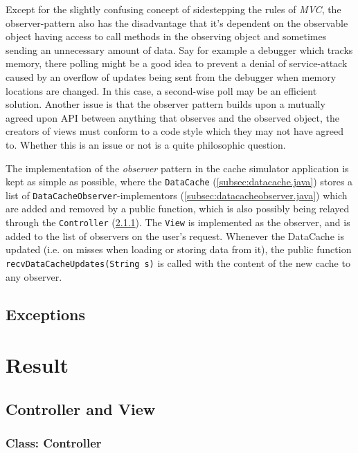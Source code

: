 \documentclass[a4paper]{scrreprt}
\begin{document}
Except for the slightly confusing concept of sidestepping the rules of \textit{MVC}, the observer-pattern also has the disadvantage that it's dependent on the observable object having access to call methods in the observing object and sometimes sending an unnecessary amount of data. Say for example a debugger which tracks memory, there polling might be a good idea to prevent a denial of service-attack caused by an overflow of updates being sent from the debugger when memory locations are changed. In this case, a second-wise poll may be an efficient solution. Another issue is that the observer pattern builds upon a mutually agreed upon API between anything that observes and the observed object, the creators of views must conform to a code style which they may not have agreed to. Whether this is an issue or not is a quite philosophic question.

The implementation of the \textit{observer} pattern in the cache simulator application is kept as simple as possible, where the \texttt{DataCache} (\ref{subsec:datacache.java}) stores a list of \texttt{DataCacheObserver}-implementors (\ref{subsec:datacacheobserver.java}) which are added and removed by a public function, which is also possibly being relayed through the \texttt{Controller} (\ref{subsec:controller.java}). The \texttt{View} is implemented as the observer, and is added to the list of observers on the user's request. Whenever the DataCache is updated (i.e. on misses when loading or storing data from it), the public function \texttt{recvDataCacheUpdates(String s)} is called with the content of the new cache to any observer.

\section{Exceptions}


\chapter{Result}
\label{sec:result}

\section{Controller and View}
\label{sec:sup}

\subsection{Class: Controller}
\label{subsec:controller.java}
\end{document}
